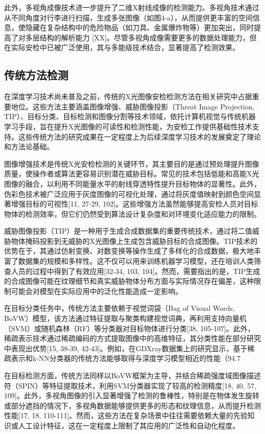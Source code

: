 \documentclass[11pt,twocolumn]{ctexart}
\begin{document}
此外，多视角成像技术进一步提升了二维X射线成像的检测能力。多视角技术通过从不同角度对行李进行扫描，生成多张图像（如图4-a），从而提供更丰富的空间信息，使隐藏在复杂结构中的危险物品（如刀具、金属爆炸物等）更加突出，同时提高了对多层结构的解析能力 [XX]。尽管多视角成像需要更多的数据处理能力，但在实际安检中已被广泛使用，其与多能级技术结合，显著提高了检测效果。

\subsection{传统方法检测}
在深度学习技术尚未普及之前，传统的X光图像安检检测方法在相关研究中占据重要地位。这些方法主要涵盖图像增强、威胁图像投影（Threat Image Projection, TIP）、目标分类、目标检测和图像分割等技术领域，依托计算机视觉与传统机器学习手段，旨在提升X光图像的可读性和检测性能，为安检工作提供基础性技术支持。这些传统方法的研究成果在一定程度上为后续深度学习技术的发展奠定了理论和方法论基础。

图像增强技术是传统X光安检检测的关键环节，其主要目的是通过预处理提升图像质量，使操作者或算法更容易识别潜在威胁目标。常见的技术包括低能和高能X光图像的融合，以利用不同能量水平的射线穿透特性提升目标物体的显著性。此外，伪彩色技术被广泛应用于灰度图像的可视化处理，通过将灰度值映射到颜色空间显著增强目标的可视性[11, 27-29, 102]。这些增强方法虽然能够提高安检人员对目标物体的检测效率，但它们仍然受到算法设计复杂度和对环境变化适应能力的限制。

威胁图像投影（TIP）是一种用于生成合成数据集的重要传统技术，通过将二值威胁物体掩码投影到无威胁的X光图像上生成包含威胁目标的合成图像。TIP技术的优势在于，其通过仿射变换、对数变换等操作生成了多样化的合成数据，极大地丰富了数据集的规模和多样性。这不仅可以用来训练机器学习模型，还在培训人类筛查人员的过程中得到了有效应用[32-34, 103, 104]。然而，需要指出的是，TIP生成的合成图像可能在纹理细节和真实威胁物体分布方面与实际情况存在偏差，这种限制可能会对模型在实际应用中的泛化性能造成一定影响。

在目标分类任务中，传统方法主要依赖于视觉词袋（Bag of Visual Words, BoVW）模型，该方法通过特征提取与聚类构建视觉词典，再利用支持向量机（SVM）或随机森林（RF）等分类器对目标物体进行分类[38, 105-107]。此外，稀疏表示技术通过稀疏编码的方式提取图像中的高维特征，其分类性能在部分研究中表现出优势[15, 38-39, 42-43]。例如，在GDXray数据集上的研究显示，基于稀疏表示和k-NN分类器的传统方法能够取得与深度学习模型相近的性能（94.7%

在目标检测方面，传统方法同样以BoVW框架为主导，并结合稀疏强度域图像描述符（SPIN）等特征提取技术，利用SVM分类器实现了较高的检测精度[18, 40, 57, 109]。此外，多视角图像的引入显著增强了检测的鲁棒性，特别是在物体发生旋转或部分遮挡的情况下，多视角数据能够提供更多的形态和纹理信息，从而提升检测性能[17, 18, 110-111]。然而，这些方法在复杂场景中往往需要依赖大量的先验知识或人工设计特征，这在一定程度上限制了其应用的广泛性和自动化程度。
\end{document}
